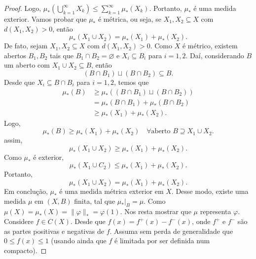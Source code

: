 \documentclass[portuguese]{article}
\theoremstyle{definition}
\begin{document}
\begin{proof}
	Logo, $\mu_*\left(\bigcup_{k=1}^\infty X_k\right)\leq\sum_{k=1}^\infty\mu_*(X_k)$. Portanto, $\mu_*$ é uma medida exterior. Vamos probar que $\mu_*$ é métrica, ou seja, se $X_1,X_2\subseteq X$ com $d(X_1,X_2)>0$, então
	\[\mu_*(X_1\cup X_2)=\mu_*(X_1)+\mu_*(X_2).\]
	De fato, sejam $X_1,X_2\subseteq X$ com $d(X_1,X_2)>0$. Como $X$ é métrico, existem abertos $B_1,B_2$ tais que $B_1\cap B_2=\varnothing$ e $X_i\subseteq B_i$ para $i=1,2$. Daí, considerando $B$ um aberto com $X_1\cup X_2\subseteq B$, então
	\[(B\cap B_1)\sqcup(B\cap B_2)\subseteq B.\]
	Desde que $X_i\subseteq B\cap B_i$ para $i=1,2$, temos que
	\begin{align*}
		\mu_*(B)&\geq\mu_*((B\cap B_1)\sqcup(B\cap B_2))\\
		&=\mu_*(B\cap B_1)+\mu_*(B\cap B_2)\\
		&\geq \mu_*(X_1)+\mu_*(X_2).
	\end{align*}
	Logo,
	\[\mu_*(B)\geq \mu_*(X_1)+\mu_*(X_2)\quad\forall \text{aberto }B\supseteq X_1\cup X_2.\]
	assim,
	\[\mu_*(X_1\cup X_2)\geq\mu_*(X_1)+\mu_*(X_2).\]
	Como $\mu_*$ é exterior,
	\[\mu_*(X_1\cup C_2)\leq\mu_*(X_1)+\mu_*(X_2).\]
	Portanto,
	\[\mu_*(X_1\cup X_2)=\mu_*(X_1)+\mu_*(X_2).\]
	Em conclução, $\mu_*$ é uma medida métrica exterior em $X$. Desse modo, existe uma medida $\mu$ em $(X,B)$ finita, tal que $\mu_*|_B=\mu$. Como $\mu(X)=\mu_*(X)=\|\varphi\|_*=\varphi(1)$. Nos resta mostrar que $\mu$ representa $\varphi$. Considere $f\in C(X)$. Desde que $f(x)=f^+(x)-f^-(x)$, onde $f^+$ e $f^-$ são as partes positivas e negativas de $f$. Assuma sem perda de generalidade que $0\leq f(x)\leq1$ (usando ainda que $f$ é limitada por ser definida num compacto).
	

\end{proof}
\end{document}
